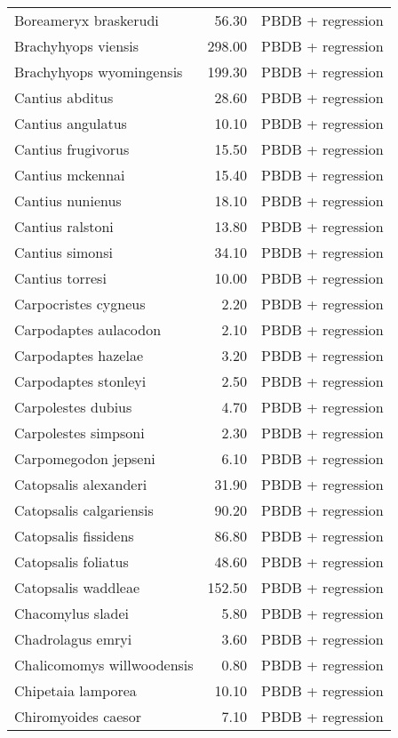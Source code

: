 \begin{table}[ht]
\begin{tabular}{lrl}
  Boreameryx braskerudi & 56.30 & PBDB + regression \\ 
  Brachyhyops viensis & 298.00 & PBDB + regression \\ 
  Brachyhyops wyomingensis & 199.30 & PBDB + regression \\ 
  Cantius abditus & 28.60 & PBDB + regression \\ 
  Cantius angulatus & 10.10 & PBDB + regression \\ 
  Cantius frugivorus & 15.50 & PBDB + regression \\ 
  Cantius mckennai & 15.40 & PBDB + regression \\ 
  Cantius nunienus & 18.10 & PBDB + regression \\ 
  Cantius ralstoni & 13.80 & PBDB + regression \\ 
  Cantius simonsi & 34.10 & PBDB + regression \\ 
  Cantius torresi & 10.00 & PBDB + regression \\ 
  Carpocristes cygneus & 2.20 & PBDB + regression \\ 
  Carpodaptes aulacodon & 2.10 & PBDB + regression \\ 
  Carpodaptes hazelae & 3.20 & PBDB + regression \\ 
  Carpodaptes stonleyi & 2.50 & PBDB + regression \\ 
  Carpolestes dubius & 4.70 & PBDB + regression \\ 
  Carpolestes simpsoni & 2.30 & PBDB + regression \\ 
  Carpomegodon jepseni & 6.10 & PBDB + regression \\ 
  Catopsalis alexanderi & 31.90 & PBDB + regression \\ 
  Catopsalis calgariensis & 90.20 & PBDB + regression \\ 
  Catopsalis fissidens & 86.80 & PBDB + regression \\ 
  Catopsalis foliatus & 48.60 & PBDB + regression \\ 
  Catopsalis waddleae & 152.50 & PBDB + regression \\ 
  Chacomylus sladei & 5.80 & PBDB + regression \\ 
  Chadrolagus emryi & 3.60 & PBDB + regression \\ 
  Chalicomomys willwoodensis & 0.80 & PBDB + regression \\ 
  Chipetaia lamporea & 10.10 & PBDB + regression \\ 
  Chiromyoides caesor & 7.10 & PBDB + regression \\ 

\end{tabular}
\end{table}
